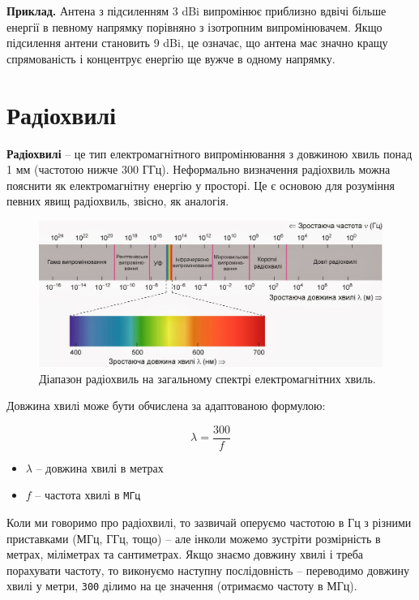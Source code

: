 \documentclass{article}
\begin{document}
\textbf{Приклад.} Антена з підсиленням 3 dBi випромінює приблизно вдвічі більше енергії в певному напрямку порівняно з ізотропним випромінювачем. Якщо підсилення антени становить 9 dBi, це означає, що антена має значно кращу спрямованість і концентрує енергію ще вужче в одному напрямку.

\section{Радіохвилі}

\textbf{Радіохвилі} -- це тип електромагнітного випромінювання з довжиною хвиль понад 1 мм (частотою нижче 300 ГГц). Неформально визначення радіохвиль можна пояснити як електромагнітну енергію у просторі. Це є основою для розуміння певних явищ радіохвиль, звісно, як аналогія.

\begin{figure}[h!]
\centering
\includegraphics[width=0.9\linewidth]{images/electromagnetic-range.jpg}
\caption{\label{fig:electromagnetic}Діапазон радіохвиль на загальному спектрі електромагнітних хвиль.}
\end{figure}

Довжина хвилі може бути обчислена за адаптованою формулою:

\[
\lambda = \frac{300}{f}
\]

\begin{itemize}[noitemsep, topsep=8pt]
\item $\lambda$ -- довжина хвилі в метрах
\item ${f}$ -- частота хвилі в \texttt{МГц}
\end{itemize}

Коли ми говоримо про радіохвилі, то зазвичай оперуємо частотою в Гц з різними приставками (МГц, ГГц, тощо) -- але інколи можемо зустріти розмірність в метрах, міліметрах та сантиметрах. Якщо знаємо довжину хвилі і треба порахувати частоту, то виконуємо наступну послідовність -- переводимо довжину хвилі у метри, \texttt{300} ділимо на це значення (отримаємо частоту в МГц).
\end{document}
